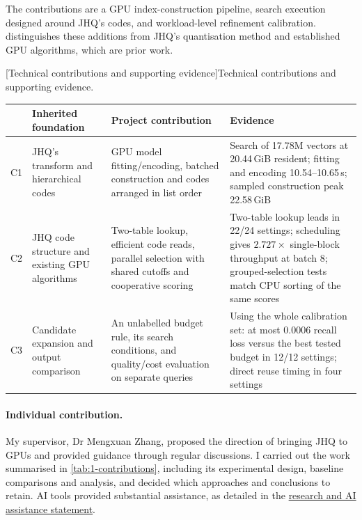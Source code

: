 The contributions are a GPU index-construction pipeline, search execution
designed around JHQ's codes, and workload-level refinement calibration.
 distinguishes these additions from JHQ's
quantisation method and established GPU algorithms, which are prior work.

\par\medskip\noindent\begin{minipage}{\linewidth}
\centering\captionsetup{hypcap=false}
[Technical contributions and supporting evidence]{Technical contributions and supporting evidence.}
\label{tab:1-contributions}
\footnotesize\setlength{\tabcolsep}{3pt}
\begin{tabularx}{\linewidth}{@{}l>{\raggedright\arraybackslash}p{.23\linewidth}*{2}{>{\raggedright\arraybackslash}X}@{}}
\toprule
 & Inherited foundation & Project contribution & Evidence \\
\midrule
C1 & JHQ's transform and hierarchical codes & GPU model fitting/encoding,
batched construction and codes arranged in list order
& Search of 17.78M vectors at 20.44\,GiB resident; fitting and encoding
10.54--10.65\,s; sampled construction peak 22.58\,GiB \\
C2 & JHQ code structure and existing GPU algorithms & Two-table lookup,
efficient code reads, parallel selection with shared cutoffs and
cooperative scoring & Two-table lookup leads in 22/24 settings;
scheduling gives $2.727\times$ single-block throughput at batch 8;
grouped-selection tests match CPU sorting of the same scores \\
C3 & Candidate expansion and output comparison & An unlabelled budget
rule, its search conditions, and quality/cost evaluation on separate queries
& Using the whole calibration set: at most 0.0006 recall loss versus the
best tested budget in 12/12 settings; direct reuse timing in four settings \\
\bottomrule
\end{tabularx}
\end{minipage}\par\medskip

\paragraph*{Individual contribution.}
My supervisor, Dr Mengxuan Zhang, proposed the direction of bringing JHQ
to GPUs and provided guidance through regular discussions. I carried out
the work summarised in \cref{tab:1-contributions}, including its
experimental design, baseline comparisons and analysis, and decided which
approaches and conclusions to retain. AI tools provided substantial
assistance, as detailed in the
\hyperref[front:provenance]{research and AI assistance statement}.
